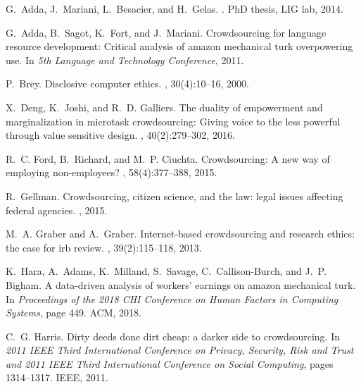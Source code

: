 \documentclass[11pt]{article}
\begin{document}

\begin{thebibliography}{10}
	
	G.~Adda, J.~Mariani, L.~Besacier, and H.~Gelas.
	.
	\newblock PhD thesis, LIG lab, 2014.
	
	G.~Adda, B.~Sagot, K.~Fort, and J.~Mariani.
	\newblock Crowdsourcing for language resource development: Critical analysis of
	amazon mechanical turk overpowering use.
	\newblock In {\em 5th Language and Technology Conference}, 2011.
	
	P.~Brey.
	\newblock Disclosive computer ethics.
	, 30(4):10--16, 2000.
	
	X.~Deng, K.~Joshi, and R.~D. Galliers.
	\newblock The duality of empowerment and marginalization in microtask
	crowdsourcing: Giving voice to the less powerful through value sensitive
	design.
	, 40(2):279--302, 2016.
	
	R.~C. Ford, B.~Richard, and M.~P. Ciuchta.
	\newblock Crowdsourcing: A new way of employing non-employees?
	, 58(4):377--388, 2015.
	
	R.~Gellman.
	\newblock Crowdsourcing, citizen science, and the law: legal issues affecting
	federal agencies.
	,
	2015.
	
	M.~A. Graber and A.~Graber.
	\newblock Internet-based crowdsourcing and research ethics: the case for irb
	review.
	, 39(2):115--118, 2013.
	
	K.~Hara, A.~Adams, K.~Milland, S.~Savage, C.~Callison-Burch, and J.~P. Bigham.
	\newblock A data-driven analysis of workers' earnings on amazon mechanical
	turk.
	\newblock In {\em Proceedings of the 2018 CHI Conference on Human Factors in
		Computing Systems}, page 449. ACM, 2018.
	
	C.~G. Harris.
	\newblock Dirty deeds done dirt cheap: a darker side to crowdsourcing.
	\newblock In {\em 2011 IEEE Third International Conference on Privacy,
		Security, Risk and Trust and 2011 IEEE Third International Conference on
		Social Computing}, pages 1314--1317. IEEE, 2011.
	

\end{thebibliography}
\end{document}
